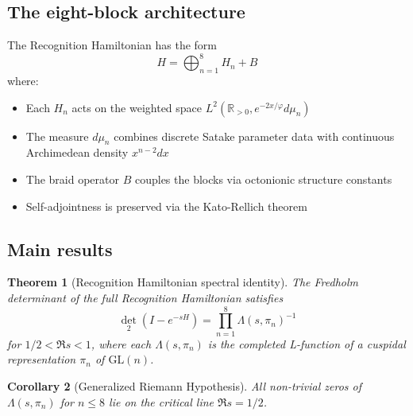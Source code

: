 \documentclass[11pt,a4paper]{article}
\newtheorem{theorem}{Theorem}[section]
\newtheorem{corollary}[theorem]{Corollary}
\theoremstyle{definition}
\theoremstyle{remark}
\begin{document}
\subsection{The eight-block architecture}

The Recognition Hamiltonian has the form
\[
H = \bigoplus_{n=1}^{8} H_n + B
\]
where:
\begin{itemize}
\item Each $H_n$ acts on the weighted space $L^2(\mathbb{R}_{>0}, e^{-2x/\varphi} d\mu_n)$
\item The measure $d\mu_n$ combines discrete Satake parameter data with continuous 
      Archimedean density $x^{n-2}dx$
\item The braid operator $B$ couples the blocks via octonionic structure constants
\item Self-adjointness is preserved via the Kato-Rellich theorem
\end{itemize}

\subsection{Main results}

\begin{theorem}[Recognition Hamiltonian spectral identity]
The Fredholm determinant of the full Recognition Hamiltonian satisfies
\[
\det_2(I - e^{-sH}) = \prod_{n=1}^8 \Lambda(s,\pi_n)^{-1}
\]
for $1/2 < \Re s < 1$, where each $\Lambda(s,\pi_n)$ is the completed L-function
of a cuspidal representation $\pi_n$ of $\mathrm{GL}(n)$.
\end{theorem}

\begin{corollary}[Generalized Riemann Hypothesis]
All non-trivial zeros of $\Lambda(s,\pi_n)$ for $n \leq 8$ lie on the critical 
line $\Re s = 1/2$.
\end{corollary}
\end{document}
